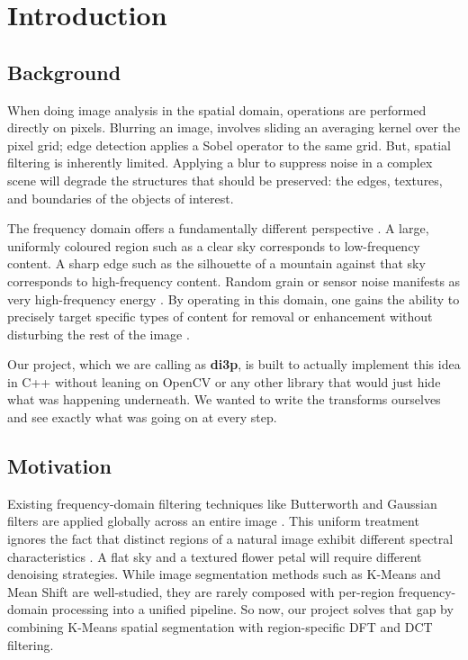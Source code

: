 \chapter{Introduction}

\section{Background}

When doing image analysis in the spatial domain, operations are performed directly
on pixels. Blurring an image, involves sliding an averaging kernel over
the pixel grid; edge detection applies a Sobel operator to the same grid. But,
spatial filtering is inherently limited. Applying a blur to suppress noise in a complex scene
will degrade the structures that should be preserved: the edges, textures, and
boundaries of the objects of interest.

\vspace{0.15in}
\noindent
The frequency domain offers a fundamentally different perspective \cite{oppenheim1999}.
A large, uniformly coloured region such as a clear sky corresponds to low-frequency
content. A sharp edge such as the silhouette of a mountain against that sky corresponds
to high-frequency content. Random grain or sensor noise manifests as very
high-frequency energy \cite{gonzalez_woods}. By operating in this domain, one gains the
ability to precisely target specific types of content for removal or enhancement without
disturbing the rest of the image \cite{pratt2007}.

\vspace{0.15in}
\noindent
Our project, which we are calling as \textbf{di3p}, is built to actually implement this idea in
C++ without leaning on OpenCV or any other library that would just hide what was
happening underneath. We wanted to write the transforms ourselves and see exactly what was going on at every step.

\section{Motivation}

Existing frequency-domain filtering techniques like Butterworth and Gaussian 
filters are applied globally across an entire image \cite{gonzalez_woods}. 
This uniform treatment ignores the fact that distinct regions of a natural image 
exhibit different spectral characteristics \cite{pratt2007}. A flat sky 
and a textured flower petal will require different denoising strategies. 
While image segmentation methods such as K-Means \cite{jain_kmeans_survey} and 
Mean Shift \cite{comaniciu2002} are well-studied, they are rarely composed with 
per-region frequency-domain processing into a unified pipeline. So now, our project solves 
that gap by combining K-Means spatial segmentation with region-specific DFT and DCT 
filtering.

